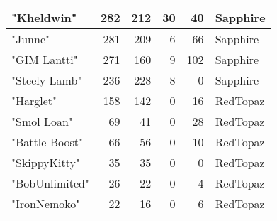 \documentclass{article}
\begin{document}
\begin{table}[htbp]
\begin{tabular}{|l|r|r|r|r|l|}
"Kheldwin" & 282 & 212 & 30 & 40 & Sapphire \\ \hline
"Junne" & 281 & 209 & 6 & 66 & Sapphire \\ \hline
"GIM Lantti" & 271 & 160 & 9 & 102 & Sapphire \\ \hline
"Steely Lamb" & 236 & 228 & 8 & 0 & Sapphire \\ \hline
"Harglet" & 158 & 142 & 0 & 16 & RedTopaz \\ \hline
"Smol Loan" & 69 & 41 & 0 & 28 & RedTopaz \\ \hline
"Battle Boost" & 66 & 56 & 0 & 10 & RedTopaz \\ \hline
"SkippyKitty" & 35 & 35 & 0 & 0 & RedTopaz \\ \hline
"BobUnlimited" & 26 & 22 & 0 & 4 & RedTopaz \\ \hline
"IronNemoko" & 22 & 16 & 0 & 6 & RedTopaz \\ \hline
\end{tabular}
\end{table}
\end{document}
